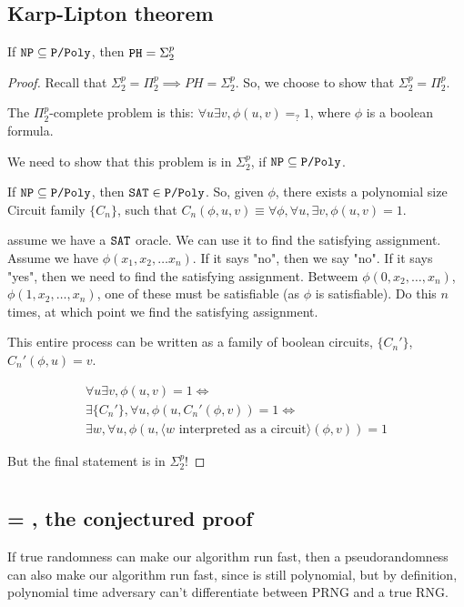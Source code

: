 \subsection{Karp-Lipton theorem}
\begin{theorem}
If $\texttt{NP} \subseteq \texttt{P/Poly}$, then $\texttt{PH} = \Sigma^p_2$
\end{theorem}
\begin{proof}
    Recall that $\Sigma^p_2 = \Pi^p_2 \implies PH = \Sigma^p_2$. So, we
    choose to show that $\Sigma^p_2 = \Pi^p_2$.

    The $\Pi^p_2$-complete problem is this: $\forall u \exists v, \phi(u, v) =_? 1$,
    where $\phi$ is a boolean formula.

    We need to show that this problem is in $\Sigma_2^p$, if $\texttt{NP} \subseteq \texttt{P/Poly}$.

    If $\texttt{NP} \subseteq \texttt{P/Poly}$, then $\texttt{SAT} \in \texttt{P/Poly}$. So, given
    $\phi$, there exists a polynomial size Circuit family $\{ C_n \}$, 
    such that $C_n (\phi, u, v) \equiv \forall \phi, \forall u, \exists v, \phi(u, v) = 1$.

    assume we have a $\texttt{SAT}$ oracle. We can use it to find the satisfying assignment.
    Assume we have $\phi(x_1, x_2, \dots x_n)$. If it says "no", then we say "no".
    If it says "yes", then we need to find the satisfying assignment.
    Betweem $\phi(0, x_2, \dots, x_n)$, $\phi(1, x_2, \dots, x_n)$, one of
    these must be satisfiable (as $\phi$ is satisfiable). Do this $n$
    times, at which point we find the satisfying assignment.

    This entire process can be written as a family of boolean circuits,
    $\{ C_n' \}$, $C_n' (\phi, u) = v$.

    \begin{align*}
        \forall u \exists v, \phi(u, v) = 1 \iff \\
        \exists \{ C_n' \}, \forall u, \phi(u, C_n'(\phi, v)) = 1 \iff \\
        \exists w, \forall u, \phi(u, \langle \text{$w$ interpreted as a circuit} \rangle(\phi, v)) = 1 
\end{align*}

But the final statement is in $\Sigma^p_2$!
\end{proof}

\section{\bpp}

\subsection{\bpp = \ptime, the conjectured proof}
If true randomness can make our algorithm run fast, then a pseudorandomness
can also make our algorithm run fast, since \bpp is still polynomial,
but by definition, polynomial time adversary can't differentiate between
PRNG and a true RNG.

